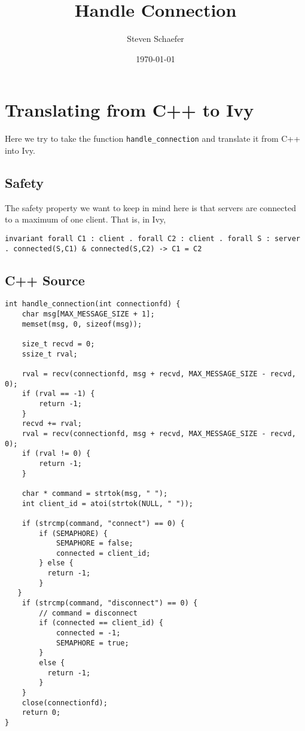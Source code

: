 \documentclass[11pt]{article}
\author{Steven Schaefer}
\date{\today}
\title{Handle Connection}
\begin{document}
\maketitle
\tableofcontents


\section{Translating from C++ to Ivy}
\label{sec:org0bc8b58}

Here we try to take the function \texttt{handle\_connection} and translate it from C++ into Ivy.

\subsection{Safety}
\label{sec:orgbca03ba}
The safety property we want to keep in mind here is that servers are connected to a maximum of one client. That is, in Ivy,
\begin{verbatim}
invariant forall C1 : client . forall C2 : client . forall S : server . connected(S,C1) & connected(S,C2) -> C1 = C2
\end{verbatim}
\subsection{C++ Source}
\label{sec:orgc4fc37c}
\begin{verbatim}
int handle_connection(int connectionfd) {
	char msg[MAX_MESSAGE_SIZE + 1];
	memset(msg, 0, sizeof(msg));

	size_t recvd = 0;
	ssize_t rval;

    rval = recv(connectionfd, msg + recvd, MAX_MESSAGE_SIZE - recvd, 0);
	if (rval == -1) {
		return -1;
    }
    recvd += rval;
    rval = recv(connectionfd, msg + recvd, MAX_MESSAGE_SIZE - recvd, 0);
    if (rval != 0) {
        return -1;
    }

    char * command = strtok(msg, " ");
    int client_id = atoi(strtok(NULL, " "));

    if (strcmp(command, "connect") == 0) {
        if (SEMAPHORE) {
            SEMAPHORE = false;
            connected = client_id;
        } else {
          return -1;
        }
   }
    if (strcmp(command, "disconnect") == 0) {
        // command = disconnect
        if (connected == client_id) {
            connected = -1;
            SEMAPHORE = true;
        }
        else {
          return -1;
        }
    }
	close(connectionfd);
	return 0;
}
\end{verbatim}
\end{document}
